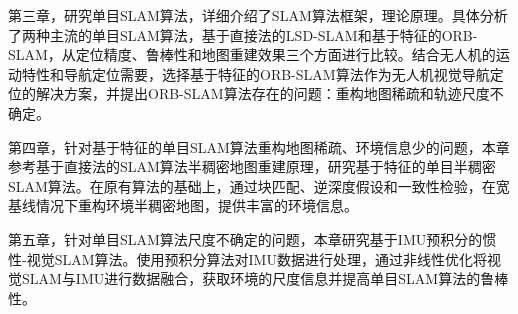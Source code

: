 第三章，研究单目SLAM算法，详细介绍了SLAM算法框架，理论原理。具体分析了两种主流的单目SLAM算法，基于直接法的LSD-SLAM和基于特征的ORB-SLAM，从定位精度、鲁棒性和地图重建效果三个方面进行比较。结合无人机的运动特性和导航定位需要，选择基于特征的ORB-SLAM算法作为无人机视觉导航定位的解决方案，并提出ORB-SLAM算法存在的问题：重构地图稀疏和轨迹尺度不确定。

第四章，针对基于特征的单目SLAM算法重构地图稀疏、环境信息少的问题，本章参考基于直接法的SLAM算法半稠密地图重建原理，研究基于特征的单目半稠密SLAM算法。在原有算法的基础上，通过块匹配、逆深度假设和一致性检验，在宽基线情况下重构环境半稠密地图，提供丰富的环境信息。

第五章，针对单目SLAM算法尺度不确定的问题，本章研究基于IMU预积分的惯性-视觉SLAM算法。使用预积分算法对IMU数据进行处理，通过非线性优化将视觉SLAM与IMU进行数据融合，获取环境的尺度信息并提高单目SLAM算法的鲁棒性。
